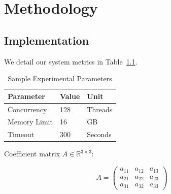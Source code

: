 \chapter{Methodology}
\label{ch:methodology}

\section{Implementation}
We detail our system metrics in Table~\ref{tab:sample_data}.

\begin{table}[htbp]
    \centering
    \caption{Sample Experimental Parameters}
    \label{tab:sample_data}
    \begin{tabular}{lll}
        \toprule
        \textbf{Parameter} & \textbf{Value} & \textbf{Unit} \\
        \midrule
        Concurrency & 128 & Threads \\
        Memory Limit & 16 & GB \\
        Timeout & 300 & Seconds \\
        \bottomrule
    \end{tabular}
\end{table}

Coefficient matrix $A \in \mathbb{R}^{3 \times 3}$:

\[
A = \begin{pmatrix}
a_{11} & a_{12} & a_{13} \\
a_{21} & a_{22} & a_{23} \\
a_{31} & a_{32} & a_{33}
\end{pmatrix}
\]